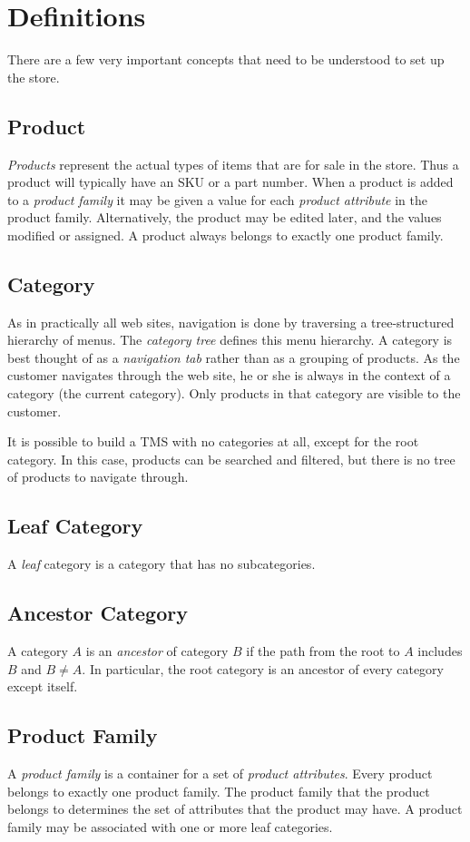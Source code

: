 \documentclass[letterpaper, 12pt]{article}
\begin{document}
\section{Definitions}
There are a few very important concepts that need to be understood to set up the store.

\subsection{Product}
{\em Products} represent the actual types of items that are for sale in the store.  Thus a product will typically have an SKU or a part number.
When a product is added to a {\em product family} it may be given a value for each {\em product attribute} in the product family.  Alternatively,
the product may be edited later, and the values modified or assigned.  A product always belongs to exactly one product family.

\subsection{Category}
As in practically all web sites, navigation is done by traversing a tree-structured hierarchy of menus. The {\em category tree} defines this menu hierarchy. A category is best thought of as a \textit{navigation tab} rather than as a grouping of products.  As the customer navigates through the web site, he or she is always in the context of a category (the current category).  Only products in that category are visible to the customer. 

It is possible to build a TMS with no categories at all, except for the root category.  In this case, products can be searched and filtered, but there is no tree of products to navigate through. 

\subsection{Leaf Category}
A \emph{leaf} category is a category that has no subcategories. 

\subsection{Ancestor Category}
A category  $A$ is an \emph{ancestor} of category $B$ if the path from the root to $A$ includes $B$ and $B \neq A$. In particular, the root category is an ancestor of every category except itself.

\subsection{Product Family}
A {\em product family} is a container for a set of \textit{product attributes}. Every product belongs to exactly one product family.  The product family that the product belongs to determines the set of attributes that the product may have.  A product family may be associated with one or more leaf categories.
\end{document}
